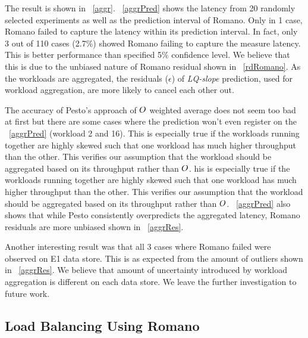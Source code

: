 The result is shown in \figurename~\ref{aggr}.
\figurename~\ref{aggrPred} shows the latency from 20 randomly selected experiments as well as the prediction interval of Romano.
Only in 1 case, Romano failed to capture the latency within its prediction interval.
In fact, only 3 out of 110 cases (2.7\%) showed Romano failing to capture the measure latency.
This is better performance than specified 5\% confidence level.
We believe that this is due to the unbiased nature of Romano residual shown in \figurename~\ref{rdRomano}.
As the workloads are aggregated, the residuals ($\epsilon$) of \emph{LQ-slope} prediction, used for workload aggregation, are more likely to cancel each other out.

The accuracy of Pesto's approach of $O$ weighted average does not seem too bad at first but there are some cases where the prediction won't even register on the \figurename~\ref{aggrPred} (workload 2 and 16).
This is especially true if the workloads running together are highly skewed such that one workload has much higher throughput than the other.
This verifies our assumption that the workload should be aggregated based on its throughput rather than $O$.
his is especially true if the workloads running together are highly skewed such that one workload has much higher throughput than the other.
This verifies our assumption that the workload should be aggregated based on its throughput rather than $O$.
\figurename~\ref{aggrPred} also shows that while Pesto consistently overpredicts the aggregated latency, Romano residuals are more unbiased shown in \figurename~\ref{aggrRes}.

Another interesting result was that all 3 cases where Romano failed were observed on E1 data store.
This is as expected from the amount of outliers shown in \figurename~\ref{aggrRes}.
We believe that amount of uncertainty introduced by workload aggregation is different on each data store.
We leave the further investigation to future work.

\subsection{Load Balancing Using Romano}

